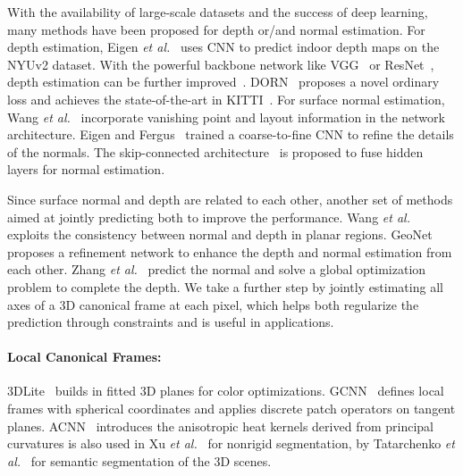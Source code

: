 With the availability of large-scale datasets and the success of deep learning, many methods have been proposed for depth or/and normal estimation. For depth estimation, Eigen \textit{et al.}~\cite{eigen2014depth} uses CNN to predict indoor depth maps on the NYUv2 dataset. With the powerful backbone network like VGG~\cite{simonyan2014very} or ResNet~\cite{he2016deep}, depth estimation can be further improved~\cite{garg2016unsupervised,xie2016deep3d}. DORN~\cite{fu2018deep} proposes a novel ordinary loss and achieves the state-of-the-art in KITTI~\cite{geiger2013vision}. For surface normal estimation, Wang \textit{et al.}~\cite{wang2015designing} incorporate vanishing point and layout information in the network architecture. Eigen and Fergus~\cite{eigen2015predicting} trained a coarse-to-fine CNN to refine the details of the normals. The skip-connected architecture~\cite{bansal2016marr} is proposed to fuse hidden layers for normal estimation.

Since surface normal and depth are related to each other, another set of methods aimed at jointly predicting both to improve the performance. Wang \textit{et al.}~\cite{wang2016surge} exploits the consistency between normal and depth in planar regions. GeoNet~\cite{qi2018geonet} proposes a refinement network to enhance the depth and normal estimation from each other. Zhang \textit{et al.}~\cite{zhang2018deep} predict the normal and solve a global optimization problem to complete the depth.  We take a further step by jointly estimating all axes of a 3D canonical frame at each pixel, which helps both regularize the prediction through constraints and is useful in applications.

\paragraph*{Local Canonical Frames:}
 3DLite~\cite{huang20173dlite} builds \cframe{} in fitted 3D planes for color optimizations. GCNN~\cite{masci2015geodesic} defines local frames with spherical coordinates and applies discrete patch operators on tangent planes. ACNN~\cite{boscaini2016learning} introduces the anisotropic heat kernels derived from principal curvatures  is also used in Xu \textit{et al.}~\cite{xu2017directionally} for nonrigid segmentation, by Tatarchenko \textit{et al.}~\cite{tatarchenko2018tangent,huang2018texturenet} for semantic segmentation of the 3D scenes. 

